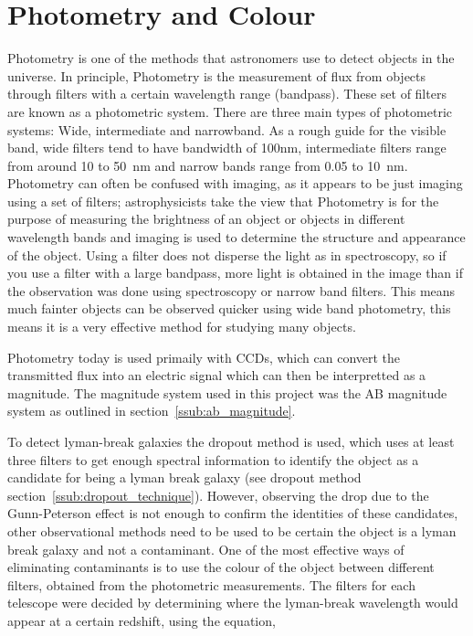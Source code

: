 
\section{Photometry and Colour} %
\label{sec:Photometry_Colour}
	Photometry is one of the methods that astronomers use to detect objects in the universe. In principle, Photometry is the measurement of flux from objects through filters with a certain wavelength range (bandpass). These set of filters are known as a photometric system. There are three main types of photometric systems: Wide, intermediate and narrowband. As a rough guide for the visible band, wide filters tend to have bandwidth of 100nm, intermediate filters range from around 10 to \SI{50}{\nano\metre} and narrow bands range from 0.05 to \SI{10}{\nano\metre}\cite[333]{Kitchin}. Photometry can often be confused with imaging, as it appears to be just imaging using a set of filters; astrophysicists take the view that Photometry is for the purpose of measuring the brightness of an object or objects in different wavelength bands and imaging is used to determine the structure and appearance of the object\cite[329]{Kitchin}. Using a filter does not disperse the light as in spectroscopy, so if you use a filter with a large bandpass, more light is obtained in the image than if the observation was done using spectroscopy or narrow band filters. This means much fainter objects can be observed quicker using wide band photometry, this means it is a very effective method for studying many objects\cite[13]{Romanishin}.

	Photometry today is used primaily with CCDs, which can convert the transmitted flux into an electric signal which can then be interpretted as a magnitude. The magnitude system used in this project was the AB magnitude system as outlined in section~\ref{ssub:ab_magnitude}.

	To detect lyman-break galaxies the dropout method is used, which uses at least three filters to get enough spectral information to identify the object as a candidate for being a lyman break galaxy (see dropout method section~\ref{ssub:dropout_technique}). However, observing the drop due to the Gunn-Peterson effect is not enough to confirm the identities of these candidates, other observational methods need to be used to be certain the object is a lyman break galaxy and not a contaminant. One of the most effective ways of eliminating contaminants is to use the colour of the object between different filters, obtained from the photometric measurements. The filters for each telescope were decided by determining where the lyman-break wavelength would appear at a certain redshift, using the equation,

